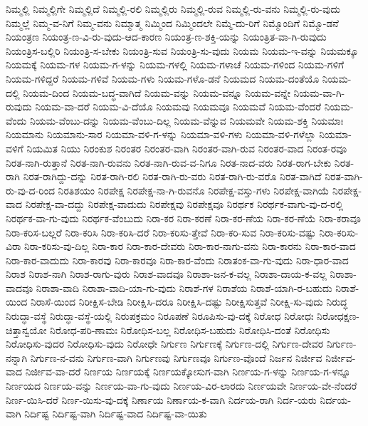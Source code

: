 {ನಿಮ್ಮಲ್ಲಿ
ನಿಮ್ಮಲ್ಲಿಗೇ
ನಿಮ್ಮಲ್ಲಿದೆ
ನಿಮ್ಮಲ್ಲಿ-ರಲಿ
ನಿಮ್ಮಲ್ಲಿರು
ನಿಮ್ಮಲ್ಲಿ-ರುವ
ನಿಮ್ಮಲ್ಲಿ-ರು-ವನು
ನಿಮ್ಮಲ್ಲಿ-ರು-ವುದು
ನಿಮ್ಮಲ್ಲೆ
ನಿಮ್ಮ-ವ-ನಿಗೆ
ನಿಮ್ಮ-ವನು
ನಿಮ್ಮಾತ್ಮ
ನಿಮ್ಮಿಂದ
ನಿಮ್ಮಿಂದಲೇ
ನಿಮ್ಮೆ-ದು-ರಿಗೆ
ನಿಮ್ಮೊಂದಿಗೆ
ನಿಮ್ಮೊ-ಡನೆ
ನಿಯಂತ್ರಣ
ನಿಯಂತ್ರ-ಣ-ವಿ-ರು-ವುದು-ಆದ-ಕಾರಣ
ನಿಯಂತ್ರ-ಣ-ಶಕ್ತಿ-ಯನ್ನು
ನಿಯಂತ್ರಿತ-ವಾ-ಗಿ-ರುವುದು
ನಿಯಂತ್ರಿಸ-ಬಲ್ಲಿರಿ
ನಿಯಂತ್ರಿ-ಸ-ಬೇಕು
ನಿಯಂತ್ರಿ-ಸುವ
ನಿಯಂತ್ರಿ-ಸು-ವುದು
ನಿಯಮ
ನಿಯಮ-ಇ-ವನ್ನು
ನಿಯಮಕ್ಕೂ
ನಿಯಮಕ್ಕೆ
ನಿಯಮ-ಗಳ
ನಿಯಮ-ಗ-ಳನ್ನು
ನಿಯಮ-ಗಳಲ್ಲಿ
ನಿಯಮ-ಗಳಾಚೆ
ನಿಯಮ-ಗಳಿಂದ
ನಿಯಮ-ಗಳಿಗೆ
ನಿಯಮ-ಗಳಿದ್ದರೆ
ನಿಯಮ-ಗಳಿವೆ
ನಿಯಮ-ಗಳು
ನಿಯಮ-ಗಳೊ-ಡನೆ
ನಿಯಮದ
ನಿಯಮ-ದಂತೆಯೊ
ನಿಯಮ-ದಲ್ಲಿ
ನಿಯಮ-ದಿಂದ
ನಿಯಮ-ಬದ್ಧ-ವಾಗಿದೆ
ನಿಯಮ-ವನ್ನು
ನಿಯಮ-ವನ್ನೂ
ನಿಯಮ-ವನ್ನೇ
ನಿಯಮ-ವಾ-ಗಿ-ರುವುದು
ನಿಯಮ-ವಾ-ದರೆ
ನಿಯಮ-ವಿ-ದೆಯೊ
ನಿಯಮವು
ನಿಯಮವೂ
ನಿಯಮವೆ
ನಿಯಮ-ವೆಂದರೆ
ನಿಯಮ-ವೆಂದು
ನಿಯಮ-ವೆಂಬು-ದನ್ನು
ನಿಯಮ-ವೆಂಬು-ದಿಲ್ಲ
ನಿಯಮ-ವೆನ್ನುವ
ನಿಯಮವೇ
ನಿಯಮ-ಶಕ್ತಿ
ನಿಯಮಾಃ
ನಿಯಮಾನು
ನಿಯಮಾನು-ಸಾರ
ನಿಯಮಾ-ವಳಿ-ಗ-ಳನ್ನು
ನಿಯಮಾ-ವಳಿ-ಗಳು
ನಿಯಮಾ-ವಳಿ-ಗಳೆಲ್ಲಾ
ನಿಯಮಾ-ವಳಿಗೆ
ನಿಯಮಿತ
ನಿಯು
ನಿರಂಕುಶ
ನಿರಂತರ
ನಿರಂತರ-ವಾಗಿ
ನಿರಂತರ-ವಾಗಿ-ರುವ
ನಿರಂತರ-ವಾದ
ನಿರಂತ-ರವೂ
ನಿರತ-ನಾಗಿ-ರುತ್ತಾನೆ
ನಿರತ-ನಾಗಿ-ರುವನು
ನಿರತ-ನಾಗಿ-ರುವ-ವ-ನಿಗೂ
ನಿರತ-ನಾದ-ವರು
ನಿರತ-ರಾಗ-ಬೇಕು
ನಿರತ-ರಾಗಿ
ನಿರತ-ರಾಗಿದ್ದು-ದನ್ನು
ನಿರತ-ರಾಗಿ-ರಲಿ
ನಿರತ-ರಾಗಿ-ರು-ವರು
ನಿರತ-ರಾಗಿ-ರು-ವರೊ
ನಿರತ-ವಾಗಿದೆ
ನಿರತ-ವಾಗಿ-ರು-ವು-ದ-ರಿಂದ
ನಿರತಿಶಯಂ
ನಿರಪೇಕ್ಷ
ನಿರಪೇಕ್ಷ-ನಾ-ಗಿ-ರುವನೊ
ನಿರಪೇಕ್ಷ-ವಸ್ತು-ಗಳು
ನಿರಪೇಕ್ಷ-ವಾಗಿಯೆ
ನಿರಪೇಕ್ಷ-ವಾದ
ನಿರಪೇಕ್ಷ-ವಾ-ದದ್ದು
ನಿರಪೇಕ್ಷ-ವಾದುದು
ನಿರಪೇಕ್ಷವು
ನಿರಪೇಕ್ಷವೂ
ನಿರರ್ಥಕ
ನಿರರ್ಥಕ-ವಾಗು-ವು-ದ-ರಲ್ಲಿ
ನಿರರ್ಥಕ-ವಾ-ಗು-ವುದು
ನಿರರ್ಥಕ-ವೆಂಬುದು
ನಿರಾ-ಕರ
ನಿರಾ-ಕರಣೆ
ನಿರಾ-ಕರ-ಣೆಯ
ನಿರಾ-ಕರ-ಣೆಯೆ
ನಿರಾ-ಕರಾವೂ
ನಿರಾ-ಕರಿಸ-ಬಲ್ಲರೆ
ನಿರಾ-ಕರಿಸಿ
ನಿರಾ-ಕರಿಸಿ-ದರೆ
ನಿರಾ-ಕರಿಸು-ತ್ತೇವೆ
ನಿರಾ-ಕರಿ-ಸುವ
ನಿರಾ-ಕರಿಸು-ವಷ್ಟು
ನಿರಾ-ಕರಿಸು-ವಿರಾ
ನಿರಾ-ಕರಿಸು-ವು-ದಿಲ್ಲ
ನಿರಾ-ಕಾರ
ನಿರಾ-ಕಾರ-ದೇವರು
ನಿರಾ-ಕಾರ-ನಾಗು-ವನು
ನಿರಾ-ಕಾರನು
ನಿರಾ-ಕಾರ-ವಾದ
ನಿರಾ-ಕಾರ-ವಾದುದು
ನಿರಾ-ಕಾರವು
ನಿರಾ-ಕಾರವೂ
ನಿರಾ-ಕಾರ-ವೆಂದು
ನಿರಾತಂಕ-ವಾ-ಗು-ವುದು
ನಿರಾ-ಧಾರ-ವಾದ
ನಿರಾಶ
ನಿರಾಶ-ನಾಗಿ
ನಿರಾಶ-ರಾಗು-ವುರು
ನಿರಾಶ-ವಾದವೂ
ನಿರಾಶಾ-ಜನ-ಕ-ವಲ್ಲ
ನಿರಾಶಾ-ದಾಯ-ಕ-ವಲ್ಲ
ನಿರಾಶಾ-ವಾದವೂ
ನಿರಾಶಾ-ವಾದಿ
ನಿರಾಶಾ-ವಾದಿ-ಯಾ-ಗು-ವುದು
ನಿರಾಶೆ-ಗಳ
ನಿರಾಶೆಯ
ನಿರಾಶೆ-ಯಾಗಿ-ರ-ಬಹುದು
ನಿರಾಶೆ-ಯಿಂದ
ನಿರಾಸೆ-ಯಿಂದ
ನಿರೀಕ್ಷಿಸ-ಬೇಡಿ
ನಿರೀಕ್ಷಿಸಿ-ದರೂ
ನಿರೀಕ್ಷಿಸಿ-ದಷ್ಟು
ನಿರೀಕ್ಷಿಸುತ್ತವೆ
ನಿರೀಕ್ಷಿ-ಸು-ವುದು
ನಿರುದ್ಧ
ನಿರುದ್ಧಾ-ವಸ್ಥೆ
ನಿರುದ್ಧಾ-ವಸ್ಥೆ-ಯಲ್ಲಿ
ನಿರುಪಕ್ರಮಂ
ನಿರೂಪಣೆ
ನಿರೂಪಿಸು-ವು-ದಕ್ಕೆ
ನಿರೋಧ
ನಿರೋಧಃ
ನಿರೋಧಕ್ಷಣ-ಚಿತ್ತಾನ್ವಯೋ
ನಿರೋಧ-ಪರಿ-ಣಾಮಃ
ನಿರೋಧಿಸ-ಬಲ್ಲ
ನಿರೋಧಿಸ-ಬಹುದು
ನಿರೋಧಿಸಿ-ದಂತೆ
ನಿರೋಧಿಸು
ನಿರೋಧಿಸು-ವುದರ
ನಿರೋಧಿಸು-ವುದು
ನಿರೋಧೇ
ನಿರ್ಗುಣ
ನಿರ್ಗುಣಕ್ಕೆ
ನಿರ್ಗುಣ-ದಲ್ಲಿ
ನಿರ್ಗುಣ-ದೇವರ
ನಿರ್ಗುಣ-ನನ್ನಾಗಿ
ನಿರ್ಗುಣ-ನ-ವನು
ನಿರ್ಗುಣ-ವಾಗಿ
ನಿರ್ಗುಣವು
ನಿರ್ಗುಣವೂ
ನಿರ್ಗುಣ-ವೊಂದೆ
ನಿರ್ಜನ
ನಿರ್ಜೀವ
ನಿರ್ಜೀವ-ವಾದ
ನಿರ್ಜೀವ-ವಾ-ದರೆ
ನಿರ್ಣಯ
ನಿರ್ಣಯಕ್ಕೆ
ನಿರ್ಣಯಕ್ಕೋಸುಗ-ವಾಗಿ
ನಿರ್ಣಯ-ಗ-ಳನ್ನು
ನಿರ್ಣಯ-ಗ-ಳನ್ನೂ
ನಿರ್ಣಯದ
ನಿರ್ಣಯ-ವನ್ನು
ನಿರ್ಣಯ-ವಾ-ಗು-ವುದು
ನಿರ್ಣಯ-ವಿರ-ಲಾರದು
ನಿರ್ಣಯವೇ
ನಿರ್ಣಯ-ವೇ-ನೆಂದರೆ
ನಿರ್ಣ-ಯಿಸಿ-ದರೆ
ನಿರ್ಣ-ಯಿಸು-ವು-ದಕ್ಕೆ
ನಿರ್ಣಾಯ
ನಿರ್ಣಾಯ-ಕ-ವಾಗಿ
ನಿರ್ದಯ-ರಾಗಿ
ನಿರ್ದ-ಯರು
ನಿರ್ದಯ-ವಾಗಿ
ನಿರ್ದಿಷ್ಟ
ನಿರ್ದಿಷ್ಟ-ವಾಗಿ
ನಿರ್ದಿಷ್ಟ-ವಾದ
ನಿರ್ದಿಷ್ಟ-ವಾ-ಯಿತು
}
